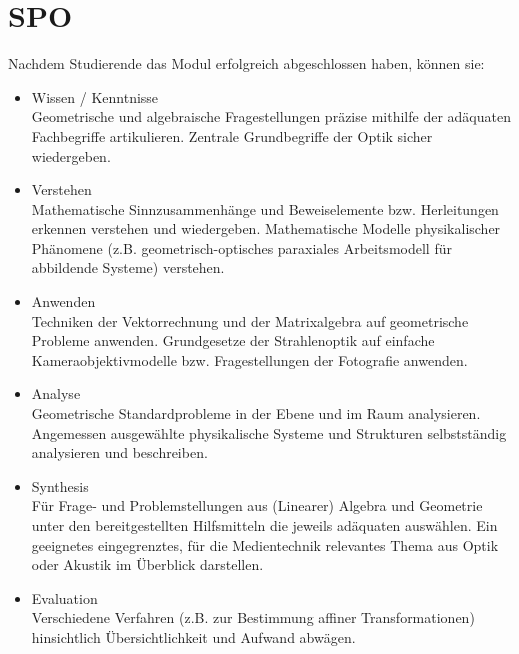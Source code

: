 \section{SPO}

    Nachdem Studierende das Modul erfolgreich abgeschlossen haben, können sie:
    \begin{itemize}
        \item Wissen / Kenntnisse\\
            Geometrische und algebraische Fragestellungen präzise mithilfe der adäquaten Fachbegriffe artikulieren. 
            \newline
            Zentrale Grundbegriffe der Optik sicher wiedergeben.
        \item Verstehen\\
            Mathematische Sinnzusammenhänge und Beweiselemente bzw. Herleitungen erkennen verstehen und wiedergeben. 
            \newline
            Mathematische Modelle physikalischer Phänomene (z.B. geometrisch-optisches paraxiales Arbeitsmodell für abbildende Systeme) verstehen.
        \item Anwenden\\
            Techniken der Vektorrechnung und der Matrixalgebra auf geometrische Probleme anwenden. \newline
            Grundgesetze der Strahlenoptik auf einfache Kameraobjektivmodelle bzw. Fragestellungen der Fotografie anwenden.
        \item Analyse\\
            Geometrische Standardprobleme in der Ebene und im Raum analysieren. 
            \newline
            Angemessen ausgewählte physikalische Systeme und Strukturen selbstständig analysieren und beschreiben.
        \newpage
        \item Synthesis\\
            Für Frage- und Problemstellungen aus (Linearer) Algebra und Geometrie unter den bereitgestellten Hilfsmitteln die jeweils adäquaten auswählen. 
            \newline
            Ein geeignetes eingegrenztes, für die Medientechnik relevantes Thema aus Optik oder Akustik im Überblick darstellen.
        \item Evaluation\\
            Verschiedene Verfahren (z.B. zur Bestimmung affiner Transformationen) hinsichtlich Übersichtlichkeit und Aufwand abwägen.
    \end{itemize}
    
\newpage